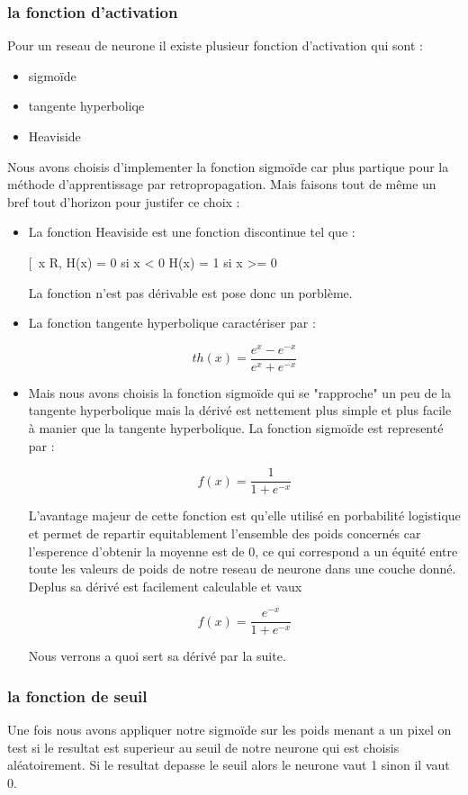 \subsubsection{la fonction d'activation}
Pour un reseau de neurone il existe plusieur fonction d'activation qui sont :
\begin{itemize}
\item sigmoïde
\item tangente hyperboliqe
\item Heaviside
\end{itemize}
\vspace{0.5cm}
Nous avons choisis d'implementer la fonction sigmoïde car plus partique pour la méthode d'apprentissage par retropropagation.
Mais faisons tout de même un bref tout d'horizon pour justifer ce choix :
\begin{itemize}
\item
La fonction Heaviside est une fonction discontinue tel que :
\begin{center}
[\
  \forall x \in R, H(x) =  0 si x < 0 H(x) = 1 si x >= 0
 \]
\end{center}
La fonction n'est pas dérivable est pose donc un porblème.
\item
La fonction tangente hyperbolique caractériser par :
\begin{center}
\[ th(x) = \frac{e^{x} - e^{-x}}{e^{x} + e^{-x}}\]
\end{center}
\item
Mais nous avons choisis la fonction sigmoïde qui se "rapproche" un peu de la tangente hyperbolique mais la dérivé est nettement plus simple et plus facile à manier que la tangente hyperbolique. La fonction sigmoïde est representé par :
\begin{center}
\[ f(x) = \frac{1}{1 + e^{-x}} \]
\end{center}
L'avantage majeur de cette fonction est qu'elle utilisé en porbabilité logistique et permet de repartir equitablement l'ensemble des poids concernés car l'esperence d'obtenir la moyenne est de 0, ce qui correspond a un équité entre toute les valeurs de poids de notre reseau de neurone dans une couche donné.
Deplus sa dérivé est facilement calculable et vaux
\begin{center}
\[ f(x) = \frac{e^{-x}}{1+e^{-x}} \]
\end{center}
Nous verrons a quoi sert sa dérivé par la suite.
\end{itemize}

\subsubsection{la fonction de seuil}
Une fois nous avons appliquer notre sigmoïde sur les poids menant a un pixel on test si le resultat est superieur au seuil de notre neurone qui est choisis aléatoirement.
Si le resultat depasse le seuil alors le neurone vaut 1 sinon il vaut 0.

